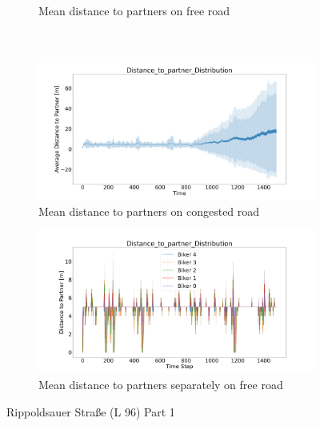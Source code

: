 \begin{figure}[H]
\begin{subfigure}[b]{0.45\textwidth}
        \caption{Mean distance to partners on free road}
    \end{subfigure}
    \\
    \begin{subfigure}[b]{0.45\textwidth}
        \centering
        \includegraphics[width=1.0\textwidth]{images/Rippoldsauer/Rippoldsauer_AVG_Distance_to_partner_distribution_congested.png}
       \caption{Mean distance to partners on congested road}
    \end{subfigure}
    \hfill
    \begin{subfigure}[b]{0.45\textwidth}
       \centering
        \includegraphics[width=1.0\textwidth]{images/Rippoldsauer/Rippoldsauer_Distance_to_partner_distribution_free.png}
        \caption{Mean distance to partners separately on free road}
    \end{subfigure}
    \caption{Rippoldsauer Straße (L 96) Part 1}
\end{figure}

